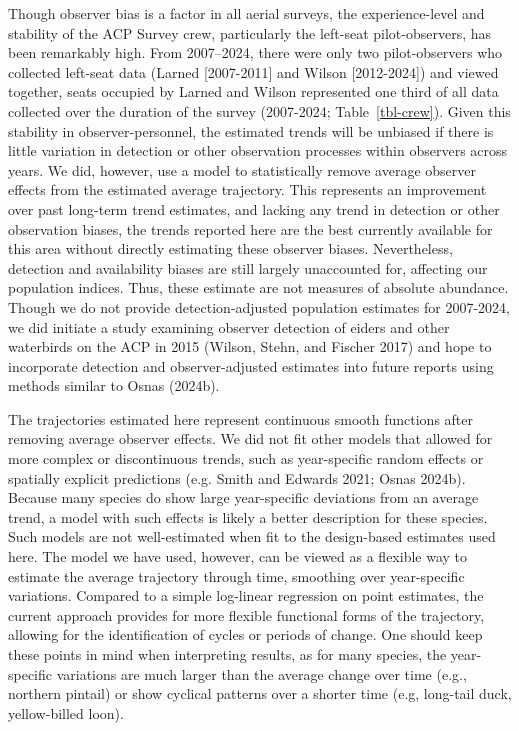 \documentclass[
]{article}
\begin{document}
Though observer bias is a factor in all aerial surveys, the
experience-level and stability of the ACP Survey crew, particularly the
left-seat pilot-observers, has been remarkably high. From 2007--2024,
there were only two pilot-observers who collected left-seat data (Larned
{[}2007-2011{]} and Wilson {[}2012-2024{]}) and viewed together, seats
occupied by Larned and Wilson represented one third of all data
collected over the duration of the survey (2007-2024;
Table~\ref{tbl-crew}). Given this stability in observer-personnel, the
estimated trends will be unbiased if there is little variation in
detection or other observation processes within observers across years.
We did, however, use a model to statistically remove average observer
effects from the estimated average trajectory. This represents an
improvement over past long-term trend estimates, and lacking any trend
in detection or other observation biases, the trends reported here are
the best currently available for this area without directly estimating
these observer biases. Nevertheless, detection and availability biases
are still largely unaccounted for, affecting our population indices.
Thus, these estimate are not measures of absolute abundance. Though we
do not provide detection-adjusted population estimates for 2007-2024, we
did initiate a study examining observer detection of eiders and other
waterbirds on the ACP in 2015 (Wilson, Stehn, and Fischer 2017) and hope
to incorporate detection and observer-adjusted estimates into future
reports using methods similar to Osnas (2024b).

The trajectories estimated here represent continuous smooth functions
after removing average observer effects. We did not fit other models
that allowed for more complex or discontinuous trends, such as
year-specific random effects or spatially explicit predictions (e.g.
Smith and Edwards 2021; Osnas 2024b). Because many species do show large
year-specific deviations from an average trend, a model with such
effects is likely a better description for these species. Such models
are not well-estimated when fit to the design-based estimates used here.
The model we have used, however, can be viewed as a flexible way to
estimate the average trajectory through time, smoothing over
year-specific variations. Compared to a simple log-linear regression on
point estimates, the current approach provides for more flexible
functional forms of the trajectory, allowing for the identification of
cycles or periods of change. One should keep these points in mind when
interpreting results, as for many species, the year-specific variations
are much larger than the average change over time (e.g., northern
pintail) or show cyclical patterns over a shorter time (e.g, long-tail
duck, yellow-billed loon).
\end{document}
